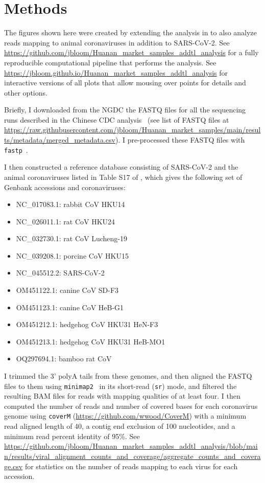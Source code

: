 \documentclass[9pt,onecolumn,twoside]{gsajnl_modified}
\begin{document}
{\small

\section{Methods}

The figures shown here were created by extending the analysis in \citet{bloom2023association} to also analyze reads mapping to animal coronaviruses in addition to SARS-CoV-2.
See \url{https://github.com/jbloom/Huanan_market_samples_addtl_analysis} for a fully reproducible computational pipeline that performs the analysis.
See \url{https://jbloom.github.io/Huanan_market_samples_addtl_analysis} for interactive versions of all plots that allow mousing over points for details and other options.

Briefly, I downloaded from the NGDC the FASTQ files for all the sequencing runs described in the Chinese CDC analysis~\citep{liu2023surveillance} (see list of FASTQ files at \url{https://raw.githubusercontent.com/jbloom/Huanan_market_samples/main/results/metadata/merged_metadata.csv}).
I pre-processed these FASTQ files with \texttt{fastp}~\citep{chen2018fastp}.

I then constructed a reference database consisting of SARS-CoV-2 and the animal coronaviruses listed in Table S17 of \citet{christoph2023genetic}, which gives the following set of Genbank accessions and coronaviruses:
\begin{itemize}
\item NC\_017083.1: rabbit CoV HKU14
\item NC\_026011.1: rat CoV HKU24
\item NC\_032730.1: rat CoV Lucheng-19
\item NC\_039208.1: porcine CoV HKU15
\item NC\_045512.2: SARS-CoV-2
\item OM451122.1: canine CoV SD-F3
 \item OM451123.1: canine CoV HeB-G1
 \item OM451212.1: hedgehog CoV HKU31 HeN-F3
 \item OM451213.1: hedgehog CoV HKU31 HeB-MO1
 \item OQ297694.1: bamboo rat CoV
\end{itemize}
I trimmed the 3' polyA tails from these genomes, and then aligned the FASTQ files to them using \texttt{minimap2}~\citep{li2018minimap2} in its short-read (\texttt{sr}) mode, and filtered the resulting BAM files for reads with mapping qualities of at least four.
I then computed the number of reads and number of covered bases for each coronavirus genome using \texttt{coverM} (\url{https://github.com/wwood/CoverM}) with a minimum read aligned length of 40, a contig end exclusion of 100 nucleotides, and a minimum read percent identity of 95\%.
See \url{https://github.com/jbloom/Huanan_market_samples_addtl_analysis/blob/main/results/viral_alignment_counts_and_coverage/aggregate_counts_and_coverage.csv} for statistics on the number of reads mapping to each virus for each accession.

}
\end{document}
